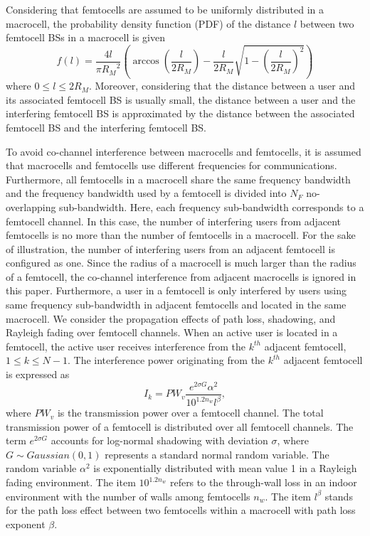 \documentclass[10pt,final,journal,letterpaper,twoside,twocolumn]{IEEEtran}
\begin{document}
Considering that femtocells are assumed to be uniformly distributed in a macrocell, the
probability density function (PDF) of the distance $l$ between two femtocell
BSs in a macrocell is given \cite{Bettstetter02}
\begin{equation}
  f(l) = \frac{{4l}}{{\pi {R_M}^2}}\left( {\arccos \left( {\frac{l}{{2{R_M}}}} \right) - \frac{l}{{2{R_M}}}\sqrt {1 - {{\left( {\frac{l}{{2{R_M}}}} \right)}^2}} } \right)
  \label{eq29}
  \tag{22}
\end{equation}
where $0 \le l \le 2{R_M}$. Moreover, considering that the distance between a user and its associated femtocell BS is usually small, the distance between a user and the interfering femtocell BS is approximated by the distance between the associated femtocell BS and the interfering femtocell BS.

To avoid co-channel interference between macrocells and femtocells, it is assumed that macrocells and femtocells use different frequencies for communications. Furthermore, all femtocells in a macrocell share the same frequency bandwidth and the frequency bandwidth used by a femtocell is divided into ${N_F}$
no-overlapping sub-bandwidth. Here, each frequency sub-bandwidth corresponds to a femtocell
channel. In this case, the number of interfering users from adjacent
femtocells is no more than the number of femtocells in a macrocell. For the sake of illustration,
the number of interfering users from an adjacent femtocell is configured as one. Since the
radius of a macrocell is much larger than the radius of a femtocell, the
co-channel interference from adjacent macrocells is ignored in this paper.
Furthermore, a user in a femtocell is only interfered by users using same
frequency sub-bandwidth in adjacent femtocells and located in the same macrocell. We consider
the propagation effects of path loss, shadowing, and Rayleigh fading over femtocell channels.
When an active user is located in a femtocell, the active user receives interference from the ${k^{th}}$ adjacent femtocell, $1 \le k \le {N-1}$.
The interference power originating from the ${k^{th}}$ adjacent femtocell is expressed as \cite{802.16m,Cheng12,Ge11}
\begin{equation}
  {I_k} = P{W_v}\frac{{{e^{2\sigma G}}{\alpha ^2}}}{{{{10}^{1.2{n_w}}}{l^\beta }}},
  \label{eq30}
  \tag{23}
\end{equation}
where $P{W_v}$ is the transmission power over a femtocell channel. The total
transmission power of a femtocell is distributed over all femtocell channels.
The term ${e^{2\sigma G}}$ accounts for log-normal shadowing with deviation
$\sigma $, where $G \sim Gaussian\left( {0,1} \right)$ represents a standard
normal random variable. The random variable ${\alpha ^2}$ is exponentially distributed
with mean value 1 in a Rayleigh fading environment. The item ${10^{1.2{n_w}}}$ refers
to the through-wall loss in an indoor environment with the number of walls
among femtocells ${n_w}$. The item ${l^\beta }$ stands for the path loss
effect between two femtocells within a macrocell with path loss exponent
$\beta$.
\end{document}
